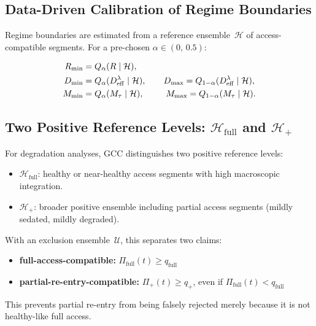 \documentclass[11pt,a4paper]{article}
\theoremstyle{plain}
\theoremstyle{definition}
\theoremstyle{remark}
\newcommand{\Deff}{D_{\mathrm{eff}}}
\newcommand{\Mtau}{M_{\tau}}
\newcommand{\Rmin}{R_{\min}}
\newcommand{\Dmin}{D_{\min}}
\newcommand{\Dmax}{D_{\max}}
\newcommand{\Mmin}{M_{\min}}
\newcommand{\Mmax}{M_{\max}}
\begin{document}
\subsection{Data-Driven Calibration of Regime Boundaries}

Regime boundaries are estimated from a reference ensemble~$\mathcal{H}$ of access-compatible segments. For a pre-chosen $\alpha \in (0,\,0.5)$:

\begin{align}
\Rmin &= Q_{\alpha}(R \mid \mathcal{H}), \notag\\
\Dmin &= Q_{\alpha}(\Deff^{\lambda} \mid \mathcal{H}), \qquad
\Dmax = Q_{1-\alpha}(\Deff^{\lambda} \mid \mathcal{H}), \label{eq:kalib}\\
\Mmin &= Q_{\alpha}(\Mtau \mid \mathcal{H}), \qquad\;\;
\Mmax = Q_{1-\alpha}(\Mtau \mid \mathcal{H}). \notag
\end{align}

\subsection{Two Positive Reference Levels: $\mathcal{H}_{\mathrm{full}}$ and $\mathcal{H}_{+}$}

For degradation analyses, GCC distinguishes two positive reference levels:

\begin{itemize}
\item $\mathcal{H}_{\mathrm{full}}$: healthy or near-healthy access segments with high macroscopic integration.
\item $\mathcal{H}_{+}$: broader positive ensemble including partial access segments (mildly sedated, mildly degraded).
\end{itemize}

With an exclusion ensemble~$\mathcal{U}$, this separates two claims:

\begin{itemize}
\item \textbf{full-access-compatible:} $\Pi_{\mathrm{full}}(t) \geq q_{\mathrm{full}}$
\item \textbf{partial-re-entry-compatible:} $\Pi_{+}(t) \geq q_{+}$, even if $\Pi_{\mathrm{full}}(t) < q_{\mathrm{full}}$
\end{itemize}

This prevents partial re-entry from being falsely rejected merely because it is not healthy-like full access.


\end{document}
